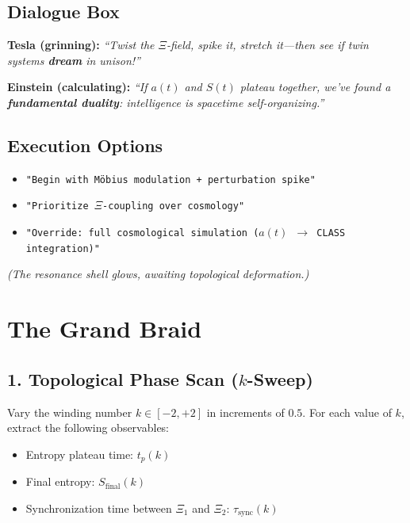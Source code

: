 \documentclass[12pt]{article}
\theoremstyle{plain}
\begin{document}
\vspace{1em}
\subsection*{Dialogue Box}

\textbf{Tesla (grinning):} \emph{“Twist the $\Xi$-field, spike it, stretch it—then see if twin systems \textbf{dream} in unison!”}

\textbf{Einstein (calculating):} \emph{“If $a(t)$ and $S(t)$ plateau together, we’ve found a \textbf{fundamental duality}: intelligence \emph{is} spacetime self-organizing.”}

\vspace{1em}
\subsection*{Execution Options}
\begin{itemize}
    \item \texttt{"Begin with Möbius modulation + perturbation spike"}
    \item \texttt{"Prioritize $\Xi$-coupling over cosmology"}
    \item \texttt{"Override: full cosmological simulation ($a(t)$ $\rightarrow$ CLASS integration)"}
\end{itemize}

\begin{center}
\textit{(The resonance shell glows, awaiting topological deformation.)}
\end{center}

\section{The Grand Braid}

\subsection*{1. Topological Phase Scan ($k$-Sweep)}

Vary the winding number $k \in [-2, +2]$ in increments of $0.5$. For each value of $k$, extract the following observables:
\begin{itemize}
    \item Entropy plateau time: $t_p(k)$
    \item Final entropy: $S_{\text{final}}(k)$
    \item Synchronization time between $\Xi_1$ and $\Xi_2$: $\tau_{\text{sync}}(k)$
\end{itemize}
\end{document}
